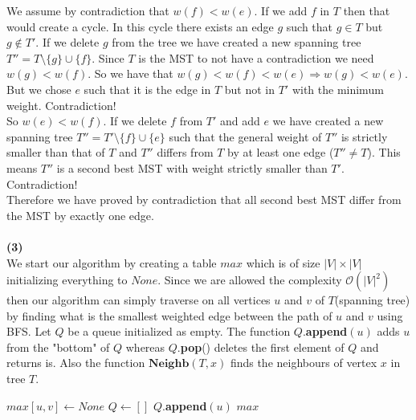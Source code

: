 \documentclass[10pt,a4paper]{article}
\begin{document}
We assume by contradiction that $w(f) < w(e)$. If we add $f$ in $T$ then that would create a cycle. In this cycle there exists an edge $g$ such that $g \in T$ but $g \not\in T'$. If we delete $g$ from the tree we have created a new spanning tree $T'' = T\setminus \{g\} \cup \{f\}$. Since $T$ is the MST to not have a contradiction we need $w(g) < w(f)$. So we have that $w(g) < w(f)< w(e) \Rightarrow w(g) < w(e)$. But we chose $e$ such that it is the edge in $T$ but not in $T'$ with the minimum weight. Contradiction!\\

So $w(e) < w(f)$. If we delete $f$ from $T'$ and add $e$ we have created a new spanning tree $T'' = T'\setminus \{f\} \cup \{e\} $ such that the general weight of $T''$ is strictly smaller than that of $T$ and $T''$ differs from $T$ by at least one edge ($T'' \neq T$). This means $T''$ is a second best MST with weight strictly smaller than $T'$. Contradiction!\\

Therefore we have proved by contradiction that all second best MST differ from the MST by exactly one edge. \\\\
\textbf{(3)}\\
We start our algorithm by creating a table $max$ which is of size $|V| \times |V|$ initializing everything to $None$. Since we are allowed the complexity $\mathcal{O}(|V|^2)$ then our algorithm can simply traverse on all vertices $u$ and $v$ of $T$(spanning tree) by finding what is the smallest weighted edge between the path of $u$ and $v$ using BFS. Let $Q$ be a queue initialized as empty. The function $Q.$\textbf{append}$(u)$ adds $u$ from the "bottom" of $Q$ whereas $Q.$\textbf{pop}()
deletes the first element of $Q$ and returns is. Also the function $\mathbf{Neighb}(T,x)$ finds the neighbours of vertex $x$ in tree $T$.

\begin{algorithm}
\begin{algorithmic}[1]
			\State $max[ u,v] \gets None$ 
		\EndFor
		\State $Q \gets []$
		\State $Q.$\textbf{append}$(u)$
		\EndWhile	
	\EndFor
	\Return $max$
\EndFunction
\end{algorithmic}
\end{algorithm}
\end{document}
